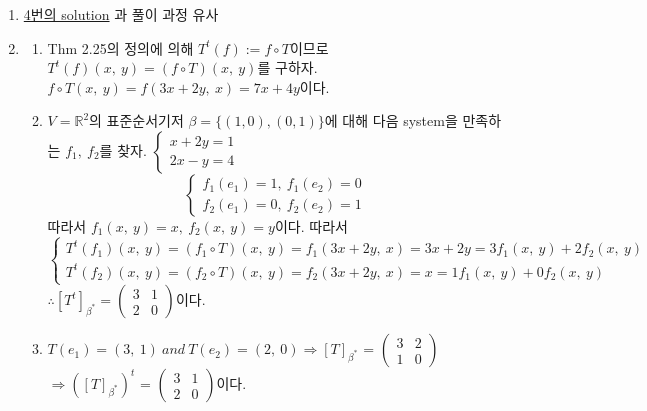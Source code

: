 \documentclass{oblivoir}
\begin{document}
\begin{enumerate}
    \item \hyperlink{2.6_4}{4번의 solution} 과 풀이 과정 유사
    \item \hypertarget{2.6_6}{}
    \begin{enumerate}
        \item Thm 2.25의 정의에 의해 $T^t(f) := f\circ T$이므로 $T^t(f)(x,\ y) = (f\circ T)(x,\ y)$를 구하자. \\
        $f\circ T(x,\ y) = f(3x+2y,\ x) = 7x+4y$이다.
        \item $V=\mathbb{R}^2$의 표준순서기저 $\beta = \{(1, 0), (0, 1)\}$에 대해 다음 system을 만족하는 $f_1,\ f_2$를 찾자.
        \(\begin{cases}
            x + 2y = 1\\ 2x-y = 4
        \end{cases}\)
        \begin{equation}\begin{cases}
            f_1(e_1) = 1,\ f_1(e_2)=0\\
            f_2(e_1) = 0,\ f_2(e_2)=1
        \end{cases}
        \end{equation}
        따라서 $f_1(x,\ y)=x,\ f_2(x,\ y)=y$이다. 따라서 
        \begin{equation}\begin{cases}
            T^t(f_1)(x,\ y) = (f_1\circ T)(x,\ y) = f_1(3x+2y,\ x) = 3x+2y = 3f_1(x,\ y) + 2f_2(x,\ y)\\
            T^t(f_2)(x,\ y) = (f_2\circ T)(x,\ y) = f_2(3x+2y,\ x) = x = 1f_1(x,\ y) + 0f_2(x,\ y)
        \end{cases}\end{equation}
        $\therefore{[T^t]}_{\beta^*}=
        \begin{pmatrix}
            3 & 1\\
            2 & 0
        \end{pmatrix}$이다.
        \item $T(e_1) = (3,\ 1)\ and\ T(e_2) = (2,\ 0) \Rightarrow {[T]}_{\beta^*}$ = 
        $\begin{pmatrix}
            3 & 2\\
            1 & 0
        \end{pmatrix}$
        $\Rightarrow {({[T]}_{\beta^*})}^t$ = 
        $\begin{pmatrix}
            3 & 1\\
            2 & 0
        \end{pmatrix}$이다.
    \end{enumerate}

\end{enumerate}
\end{document}
